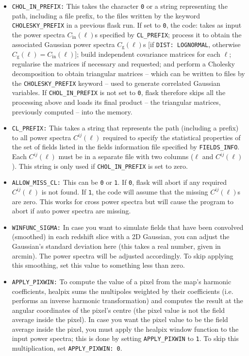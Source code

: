\documentclass[12pt]{book} %
\newcommand{\nv}[1]{\mathrm{#1}}                 %
\begin{document}
\begin{itemize}
\item {\tt CHOL\_IN\_PREFIX:} This takes the character {\tt 0} or a string representing the path, including 
  a file prefix, to the files written by the keyword {\tt CHOLESKY\_PREFIX} in a previous {\sc flask} run. If set to 
  {\tt 0}, the code: takes as input the power spectra $C_{\nv{in}}(\ell)$s specified by {\tt CL\_PREFIX}; 
  process it to obtain the associated Gaussian power spectra $C_{\nv{g}}(\ell)$s [if {\tt DIST: LOGNORMAL}, 
  otherwise $C_{\nv{g}}(\ell)=C_{\nv{in}}(\ell)$]; build independent covariance matrices for each $\ell$; 
  regularise the matrices if necessary and requested; and perform a Cholesky decomposition to obtain 
  triangular matrices -- which can be written to files by the {\tt CHOLESKY\_PREFIX} keyword -- used 
  to generate correlated Gaussian variables. If {\tt CHOL\_IN\_PREFIX} is not set to {\tt 0}, {\sc flask} 
  therefore skips all the processing above and loads its final product -- the triangular matrices, previously
  computed -- into the memory.

\item {\tt CL\_PREFIX:} This takes a string that represents the path (including a prefix) to all 
  power spectra $C^{ij}(\ell)$ required to specify the statistical properties of the set of fields 
  listed in the fields information file specified by {\tt FIELDS\_INFO}. Each $C^{ij}(\ell)$ must 
  be in a separate file with two columns ($\ell$ and $C^{ij}(\ell)$). This string is only used 
  if {\tt CHOL\_IN\_PREFIX} is set to zero.

\item {\tt ALLOW\_MISS\_CL:} This can be {\tt 0} or {\tt 1}. If {\tt 0}, {\sc flask} will abort 
  if any required $C^{ij}(\ell)$ is not found. If {\tt 1}, the code will assume that the missing 
  $C^{ij}(\ell)$s are zero. This works for cross power spectra but will cause the program to abort 
  if auto power spectra are missing.

\item {\tt WINFUNC\_SIGMA:} In case you want to simulate fields that have been convolved 
  (smoothed) in each redshift slice with a 2D Gaussian, you can adjust the Gaussian's standard 
  deviation here (this takes a real number, given in arcmin). The power spectra will be adjusted accordingly. 
  To skip applying this smoothing, set this value to something less than zero.

\item {\tt APPLY\_PIXWIN:} To compute the value of a pixel from the map's harmonic coefficients, 
  {\sc healpix} sums the multipoles weighted by their coefficients (i.e. performs an inverse 
  harmonic transformation) and computes the result at the angular coordinates of the pixel's 
  centre (the pixel value is not the field average inside the pixel). In case you want the pixel 
  value to be the field average inside the pixel, you must apply the {\sc healpix} window function 
  to the input power spectra; this is done by setting {\tt APPLY\_PIXWIN} to {\tt 1}. To skip 
  this multiplication, set {\tt APPLY\_PIXWIN: 0}.


\end{itemize}
\end{document}
